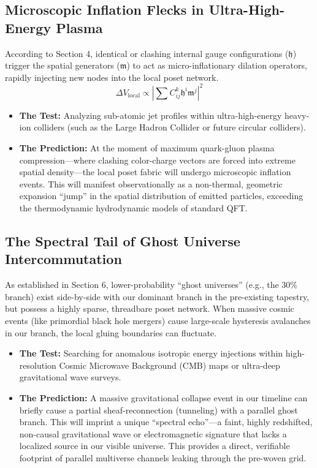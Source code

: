 \documentclass[12pt,letterpaper]{article}
\begin{document}
\subsection{Microscopic Inflation Flecks in Ultra-High-Energy Plasma}
According to Section 4, identical or clashing internal gauge configurations ($\mathfrak{h}$) trigger the spatial generators ($\mathfrak{m}$) to act as micro-inflationary dilation operators, rapidly injecting new nodes into the local poset network.
$$\Delta V_{\text{local}} \propto \left| \sum C_{ij}^k \mathfrak{h}^i \mathfrak{m}^j \right|^2$$
\begin{itemize}
    \item \textbf{The Test:} Analyzing sub-atomic jet profiles within ultra-high-energy heavy-ion colliders (such as the Large Hadron Collider or future circular colliders).
    \item \textbf{The Prediction:} At the moment of maximum quark-gluon plasma compression---where clashing color-charge vectors are forced into extreme spatial density---the local poset fabric will undergo microscopic inflation events. This will manifest observationally as a non-thermal, geometric expansion ``jump'' in the spatial distribution of emitted particles, exceeding the thermodynamic hydrodynamic models of standard QFT.
\end{itemize}

\subsection{The Spectral Tail of Ghost Universe Intercommutation}
As established in Section 6, lower-probability ``ghost universes'' (e.g., the 30\% branch) exist side-by-side with our dominant branch in the pre-existing tapestry, but possess a highly sparse, threadbare poset network. When massive cosmic events (like primordial black hole mergers) cause large-scale hysteresis avalanches in our branch, the local gluing boundaries can fluctuate.
\begin{itemize}
    \item \textbf{The Test:} Searching for anomalous isotropic energy injections within high-resolution Cosmic Microwave Background (CMB) maps or ultra-deep gravitational wave surveys.
    \item \textbf{The Prediction:} A massive gravitational collapse event in our timeline can briefly cause a partial sheaf-reconnection (tunneling) with a parallel ghost branch. This will imprint a unique ``spectral echo''---a faint, highly redshifted, non-causal gravitational wave or electromagnetic signature that lacks a localized source in our visible universe. This provides a direct, verifiable footprint of parallel multiverse channels leaking through the pre-woven grid.
\end{itemize}
\end{document}
